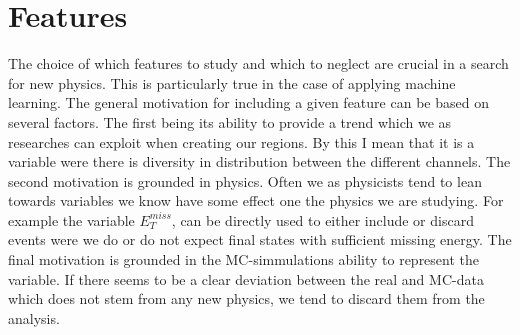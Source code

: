 \section{Features}
The choice of which features to study and which to neglect are crucial in a search for new physics. This is particularly true 
in the case of applying machine learning. The general motivation for including a given feature can be based on several factors. 
The first being its ability to provide a trend which we as researches can exploit when creating our regions. By this I mean
that it is a variable were there is diversity in distribution between the different channels. The second motivation is grounded in 
physics. Often we as physicists tend to lean towards variables we know have some effect one the physics we are studying. For 
example the variable $E_T^{miss}$, can be directly used to either include or discard events were we do or do not expect final states
with sufficient missing energy. The final motivation is grounded in the \ac{MC}-simmulations ability to represent the variable.
If there seems to be a clear deviation between the real and \ac{MC}-data which does not stem from any new physics, we tend to discard
them from the analysis.